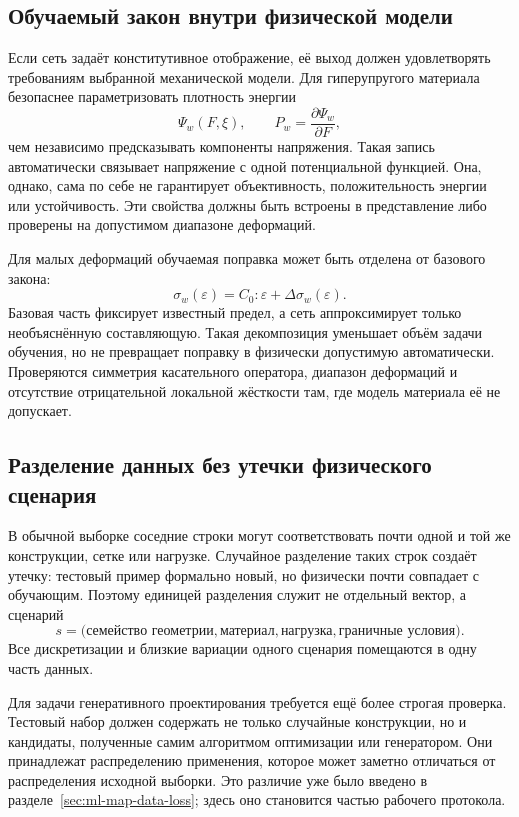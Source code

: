 \subsection{Обучаемый закон внутри физической модели}
Если сеть задаёт конститутивное отображение, её выход должен удовлетворять требованиям выбранной механической модели. Для гиперупругого материала безопаснее параметризовать плотность энергии
\begin{equation}
 \Psi_w(F,\xi),
 \qquad
 P_w
 =
 \frac{\partial\Psi_w}{\partial F},
\end{equation}
чем независимо предсказывать компоненты напряжения. Такая запись автоматически связывает напряжение с одной потенциальной функцией. Она, однако, сама по себе не гарантирует объективность, положительность энергии или устойчивость. Эти свойства должны быть встроены в представление либо проверены на допустимом диапазоне деформаций.

Для малых деформаций обучаемая поправка может быть отделена от базового закона:
\begin{equation}
 \sigma_w(\varepsilon)
 =
 C_0:\varepsilon
 +
 \Delta\sigma_w(\varepsilon).
\end{equation}
Базовая часть фиксирует известный предел, а сеть аппроксимирует только необъяснённую составляющую. Такая декомпозиция уменьшает объём задачи обучения, но не превращает поправку в физически допустимую автоматически. Проверяются симметрия касательного оператора, диапазон деформаций и отсутствие отрицательной локальной жёсткости там, где модель материала её не допускает.

\subsection{Разделение данных без утечки физического сценария}
В обычной выборке соседние строки могут соответствовать почти одной и той же конструкции, сетке или нагрузке. Случайное разделение таких строк создаёт утечку: тестовый пример формально новый, но физически почти совпадает с обучающим. Поэтому единицей разделения служит не отдельный вектор, а сценарий
\begin{equation}
 s
 =
 \bigl(
  \text{семейство геометрии},
  \text{материал},
  \text{нагрузка},
  \text{граничные условия}
 \bigr).
\end{equation}
Все дискретизации и близкие вариации одного сценария помещаются в одну часть данных.

Для задачи генеративного проектирования требуется ещё более строгая проверка. Тестовый набор должен содержать не только случайные конструкции, но и кандидаты, полученные самим алгоритмом оптимизации или генератором. Они принадлежат распределению применения, которое может заметно отличаться от распределения исходной выборки. Это различие уже было введено в разделе~\ref{sec:ml-map-data-loss}; здесь оно становится частью рабочего протокола.

